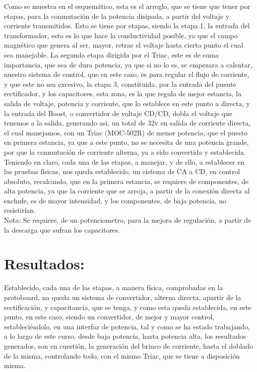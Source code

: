 \documentclass[12pt,letterpaper]{article}
\begin{document}
Como se muestra en el esquemático, esta es el arreglo, que se tiene que tener por etapas, para la conmutación de la potencia disipada, a partir del voltaje y corriente transmitidos. Esto se tiene por etapas, siendo la etapa 1, la entrada del transformador, esto es lo que hace la conductividad posible, ya que el campo magnético que genera al ser, mayor, retrae el voltaje hasta cierto punto el cual sea manejable. La segunda etapa dirigida por el Triac, este es de suma importancia, que sea de dura potencia, ya que si no lo es, se empezara a calentar, nuestro sistema de control, que en este caso, es para regular el flujo de corriente, y que este no sea excesivo, la etapa 3, constituida, por la entrada del puente rectificador, y los capacitores, esta zona, es la que regula de mejor estancia, la salida de voltaje, potencia y corriente, que lo establece en este punto a directa, y la entrada del Boost, o convertidor de voltaje CD/CD, dobla el voltaje que tenemos a la salida, generando asi, un total de 32v en salida de corriente directa, el cual manejamos, con un Triac (MOC-502R) de menor potencia, que el puesto en primera estancia, ya que a este punto, no se necesita de una potencia grande, por que la conmutación de corriente alterna, ya a sido convertida y establecida.\\

Teniendo en claro, cada una de las etapas, a manejar, y de ello, a establecer en las pruebas físicas, nos queda establecido, un sistema de CA a CD, en control absoluto, recalcando, que en la primera estancia, se requiere de componentes, de alta potencia, ya que la corriente que se arroja, a partir de la conexión directa al enchufe, es de mayor intensidad, y los componentes, de baja potencia, no resistirían.\\

Nota: Se requiere, de un potenciometro, para la mejora de regulación, a partir de la descarga que sufran los capacitores.

\section{Resultados:}

Establecido, cada una de las etapas, a manera física, comprobadas en la protoboard, no queda un sistema de convertidor, alterna directa, apartir de la rectificación, y capacitancia, que se tenga, y como esta queda establecida, en este punto, en este caso, siendo un convertidor, de mejor y mayor control, estableciéndolo, en una interfaz de potencia, tal y como se ha estado trabajando, a lo largo de este curso, desde baja potencia, hasta potencia alta, los resultados generados, son en cuestión, la generación del brinco de corriente, hasta el doblado de la misma, controlando todo, con el mismo Triac, que se tiene a disposición misma.\\
\end{document}
